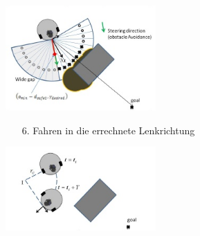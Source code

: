 \documentclass[a0paper,portrait]{baposter}
\begin{document}
\begin{poster}
{\begin{itemize}
\end{itemize}
\begin{center}
	\vspace{-.25cm}
	\includegraphics[width=5.75cm]{Bilder/navigation2}
\end{center}
\vspace{-.75cm}
\begin{itemize}
\item[6.] Fahren in die errechnete Lenkrichtung 
\end{itemize}
\begin{center}
	\vspace{-.25cm}
	\includegraphics[width=5.75cm]{Bilder/navigation4}
\end{center}
}




\end{poster}
\end{document}

